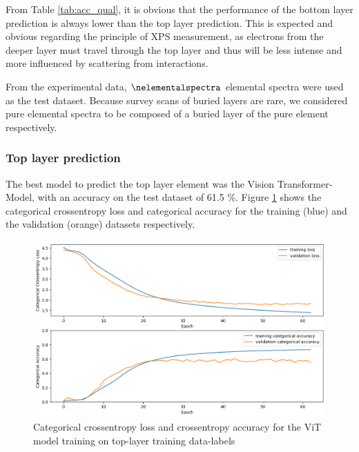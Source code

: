 From Table \ref{tab:acc_qual}, it is obvious that the performance of the bottom layer prediction is always lower than the top layer prediction. This is expected and obvious regarding the principle of XPS measurement, as electrons from the deeper layer must travel through the top layer and thus will be less intense and more influenced by scattering from interactions.

From the experimental data, $\nelementalspectra$ elemental spectra were used as the test dataset. Because survey scans of buried layers are rare, we considered pure elemental spectra to be composed of a buried layer of the pure element respectively.

\subsubsection{Top layer prediction}
The best model to predict the top layer element was the Vision Transformer-Model, with an accuracy on the test dataset of 61.5 \%. Figure \ref{fig:top_best_loss} shows the categorical crossentropy loss and categorical accuracy for the training (blue) and the validation (orange) datasets respectively. 



\begin{figure}[H]
    \centering
    \includegraphics[width=\textwidth]{Figures/top_best_loss_acc_vit_4_32_3_4_64.png}
    \caption{Categorical crossentropy loss and crossentropy accuracy for the ViT model training on top-layer training data-labels}
    \label{fig:top_best_loss}
\end{figure}

